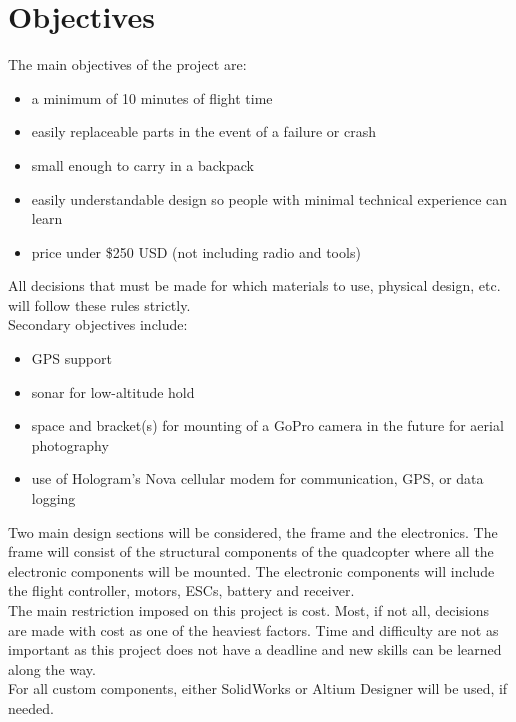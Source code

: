 \documentclass[12pt]{article}
\begin{document}
\section{Objectives}

The main objectives of the project are:
\renewcommand{\labelitemi}{\textperiodcentered}
\begin{itemize}
\item a minimum of 10 minutes of flight time
\item easily replaceable parts in the event of a failure or crash
\item small enough to carry in a backpack
\item easily understandable design so people with minimal technical experience can learn
\item price under \$250 USD (not including radio and tools)
\end{itemize}

All decisions that must be made for which materials to use, physical design, etc. will follow these rules strictly.
\\

Secondary objectives include:
\renewcommand{\labelitemi}{\textperiodcentered}
\begin{itemize}
\item GPS support
\item sonar for low-altitude hold
\item space and bracket(s) for mounting of a GoPro camera in the future for aerial photography
\item use of Hologram's Nova cellular modem for communication, GPS, or data logging
\end{itemize}

Two main design sections will be considered, the frame and the electronics. The frame will consist of the structural components of the quadcopter where all the electronic components will be mounted. The electronic components will include the flight controller, motors, ESCs, battery and receiver. 
\\

The main restriction imposed on this project is cost. Most, if not all, decisions are made with cost as one of the heaviest factors. Time and difficulty are not as important as this project does not have a deadline and new skills can be learned along the way.
\\

For all custom components, either SolidWorks or Altium Designer will be used, if needed.
\end{document}

